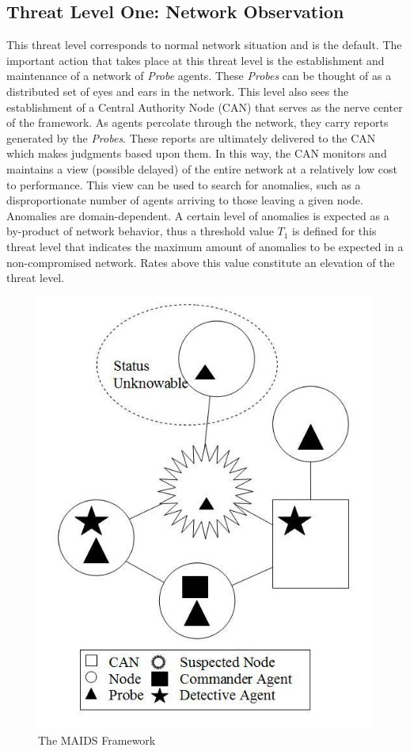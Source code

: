 \documentclass{acm_proc_article-sp}
\begin{document}
\subsection{Threat Level One: Network Observation}
This threat level corresponds to normal network situation and is the default.  The important action that takes place at this threat level is the establishment and maintenance of a network of {\it Probe} agents.  These {\it Probes} can be thought of as a distributed set of eyes and ears in the network.  This level also sees the establishment of a Central Authority Node (CAN) that serves as the nerve center of the framework.  As agents percolate through the network, they carry reports generated by the {\it Probes}.  These reports are ultimately delivered to the CAN which makes judgments based upon them.  In this way, the CAN monitors and maintains a view (possible delayed) of the entire network at a relatively low cost to performance.  This view can be used to search for anomalies, such as a disproportionate number of agents arriving to those leaving a given node.  Anomalies are domain-dependent.  A certain level of anomalies is expected as a by-product of network behavior, thus a threshold value $T_1$ is defined for this threat level that indicates the maximum amount of anomalies to be expected in a non-compromised network.  Rates above this value constitute an elevation of the threat level.

\begin{figure}
\centering
\includegraphics[scale=0.45]{maids}
\caption{The MAIDS Framework}
\label{fig:framework}
\end{figure}
\end{document}

